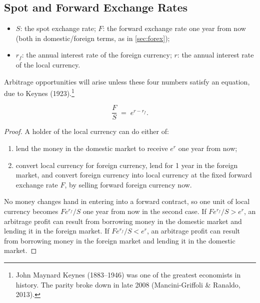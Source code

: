 \subsection{Spot and Forward Exchange Rates}
\label{sec:irp}


\begin{notation}
	\begin{itemize}[nosep]
		\item $S$: the spot exchange rate; $F$: the forward exchange rate one year from now (both in domestic/foreign terms, as in \autoref{sec:forex});
		\item $r_{f}$: the annual interest rate of the foreign currency; $r$: the annual interest rate of the local currency.
	\end{itemize}
\end{notation}

Arbitrage opportunities will arise unless these four numbers satisfy an equation, due to Keynes (1923).\footnote{John Maynard Keynes (1883--1946) was one of the greatest economists in history. The parity broke down in late 2008 (Mancini-Griffoli \& Ranaldo, 2013).}

\begin{theorem}
	\label{thm:irp}
	\begin{equation}
		\frac{F}{S} \;=\; e^{r-r_{f}} .
		\label{eq:irp}
	\end{equation}
\end{theorem}

\begin{proof}
	A holder of the local currency can do either of:
	\begin{enumerate}[(1),nosep]
		\item lend the money in the domestic market to receive $e^{r}$ one year from now;
		\item convert local currency for foreign currency, lend for 1 year in the foreign market, and convert foreign currency into local currency at the fixed forward exchange rate $F$, by selling forward foreign currency now.
	\end{enumerate}
	No money changes hand in entering into a forward contract, so one unit of local currency becomes $Fe^{r_{f}}/S$ one year from now in the second case.
	If $Fe^{r_{f}}/S>e^{r}$, an arbitrage profit can result from borrowing money in the domestic market and lending it in the foreign market.
	If $Fe^{r_{f}}/S<e^{r}$, an arbitrage profit can result from borrowing money in the foreign market and lending it in the domestic market.
\end{proof}

